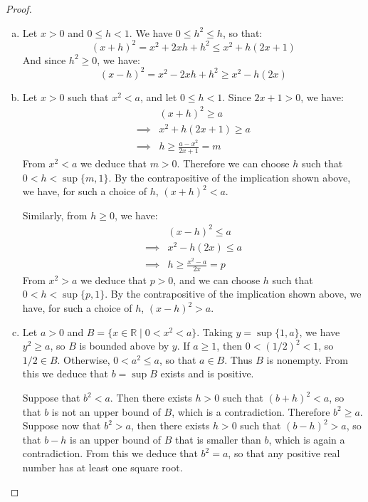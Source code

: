 \documentclass[11pt,a4paper,twoside]{article}
\theoremstyle{definition}
\begin{document}
\begin{proof}\hfill

  \begin{enumerate}[(a)]

  \item Let $x > 0$ and $0 \leq h < 1$. We have $0 \leq h^2 \leq h$, so that:
    \begin{equation*}
      (x + h)^2 = x^2 + 2 x h + h^2 \leq x^2 + h(2 x + 1)
    \end{equation*}
    And since $h^2 \geq 0$, we have:
    \begin{equation*}
      (x - h)^2 = x^2 - 2 x h + h^2 \geq x^2 - h (2 x)
    \end{equation*}

  \item Let $x > 0$ such that $x^2 < a$, and let $0 \leq h < 1$. Since $2 x + 1 > 0$, we have:
    \begin{align*}
      & (x + h)^2 \geq a \\
      \implies & x^2 + h (2 x + 1) \geq a \\
      \implies & h \geq \frac{a - x^2}{2 x + 1} = m
    \end{align*}
    From $x^2 < a$ we deduce that $m > 0$. Therefore we can choose $h$ such that $0 < h < \sup \{ m, 1 \}$. By the contrapositive of the implication shown above,
    we have, for such a choice of $h$, $(x + h)^2 < a$.

    Similarly, from $h \geq 0$, we have:
    \begin{align*}
      & (x - h)^2 \leq a \\
      \implies & x^2 -h (2 x) \leq a \\
      \implies & h \geq \frac{x^2 - a}{2 x} = p
    \end{align*}
    From $x^2 > a$ we deduce that $p > 0$, and we can choose $h$ such that $0 < h < \sup \{ p, 1 \}$. By the contrapositive of the implication shown above,
    we have, for such a choice of $h$, $(x - h)^2 > a$.

  \item Let $a > 0$ and $B = \{ x \in \mathbb{R} \mid 0 < x^2 < a \}$. Taking $y = \sup \{ 1, a \}$, we have $y^2 \geq a$, so $B$ is bounded above by $y$.
    If $a \geq 1$, then $0 < (1 / 2)^2 < 1$, so $1 / 2 \in B$. Otherwise, $0 < a^2 \leq a$, so that $a \in B$. Thus $B$ is nonempty.
    From this we deduce that $b = \sup B$ exists and is positive.

    Suppose that $b^2 < a$. Then there exists $h > 0$ such that $(b + h)^2 < a$, so that $b$ is not an upper bound of $B$, which is a contradiction.
    Therefore $b^2 \geq a$. Suppose now that $b^2 > a$, then there exists $h > 0$ such that $(b - h)^2 > a$, so that $b - h$ is an upper bound of $B$ that is smaller than $b$,
    which is again a contradiction. From this we deduce that $b^2 = a$, so that any positive real number has at least one square root.


\end{enumerate}
\end{proof}
\end{document}
